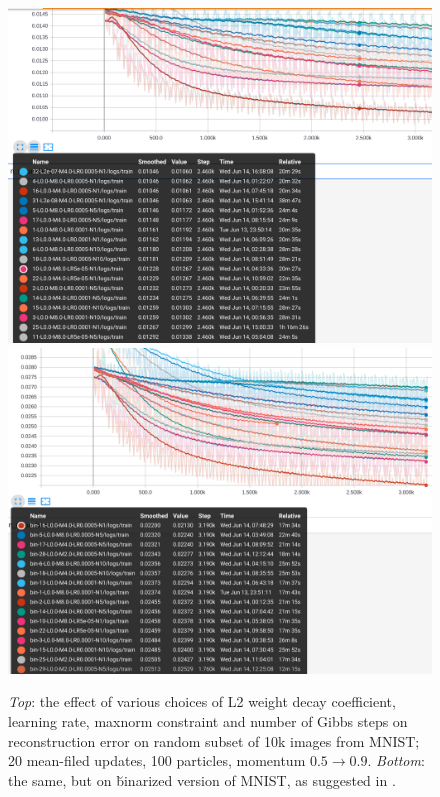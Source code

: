 \begin{figure}[h]
\begin{mdframed}
\centering
\includegraphics[width=4.6in]{dbm-mnist/lr_l2_maxnorm_10k.png}
\\[0.5em]
\includegraphics[width=4.6in]{dbm-mnist/l2_m_lr_n_bin_10k.png}
\caption{\emph{Top}: the effect of various choices of L2 weight decay coefficient, learning rate, maxnorm constraint and number of Gibbs steps on reconstruction error on random subset of 10k images from MNIST; 20 mean-filed updates, 100 particles, momentum $0.5\rightarrow 0.9$. \emph{Bottom}: the same, but on \u{binarized} version of MNIST, as suggested in \cite{goodfellow2012joint}.}
\end{mdframed}
\end{figure}

\clearpage

